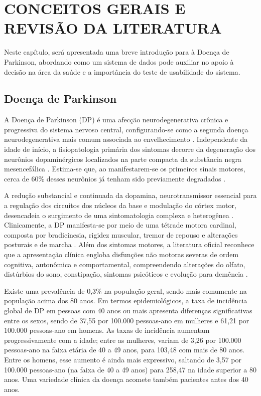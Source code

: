 
\chapter{CONCEITOS GERAIS E REVISÃO DA LITERATURA}
\label{chap:fundamentacao}

Neste capítulo, será apresentada uma breve introdução para à Doença de Parkinson, abordando como um sistema de dados pode auxiliar no apoio à decisão na área da saúde e a importância do teste de usabilidade do sistema.

\section{Doença de Parkinson}
\label{sec:Parkinson}

A Doença de Parkinson (DP) é uma afecção neurodegenerativa crônica e progressiva do sistema nervoso central, configurando-se como a segunda doença neurodegenerativa mais comum associada ao envelhecimento \cite{magalhaes2022teorias}. Independente da idade de início, a fisiopatologia primária dos sintomas decorre da degeneração dos neurônios dopaminérgicos localizados na parte compacta da substância negra mesencefálica \cite{silva2021doenca, Santos2024, Lima2023}. Estima-se que, ao manifestarem-se os primeiros sinais motores, cerca de 60\% desses neurônios já tenham sido previamente degradados \cite{silva2021doenca}.

A redução substancial e continuada da dopamina, neurotransmissor essencial para a regulação dos circuitos dos núcleos da base e modulação do córtex motor, desencadeia o surgimento de uma sintomatologia complexa e heterogênea \cite{Lima2023, Cabreira2019}. Clinicamente, a DP manifesta-se por meio de uma tétrade motora cardinal, composta por bradicinesia, rigidez muscular, tremor de repouso e alterações posturais e de marcha \cite{Santos2024, Luiz2022}. Além dos sintomas motores, a literatura oficial reconhece que a apresentação clínica engloba disfunções não motoras severas de ordem cognitiva, autonômica e comportamental, compreendendo alterações do olfato, distúrbios do sono, constipação, sintomas psicóticos e evolução para demência \cite{brasil2025, Santos2024, Cabreira2019}.

Existe uma prevalência de 0,3\% na população geral, sendo mais comumente na população acima dos 80 anos. Em termos epidemiológicos, a taxa de incidência global de DP em pessoas com 40 anos ou mais apresenta diferenças significativas entre os sexos, sendo de 37,55 por 100.000 pessoas-ano em mulheres e 61,21 por 100.000 pessoas-ano em homens. As taxas de incidência aumentam progressivamente com a idade; entre as mulheres, variam de 3,26 por 100.000 pessoas-ano na faixa etária de 40 a 49 anos, para 103,48 com mais de 80 anos. Entre os homens, esse aumento é ainda mais expressivo, saltando de 3,57 por 100.000 pessoas-ano (na faixa de 40 a 49 anos) para 258,47 na idade superior a 80 anos. Uma variedade clínica da doença acomete também pacientes antes dos 40 anos.


